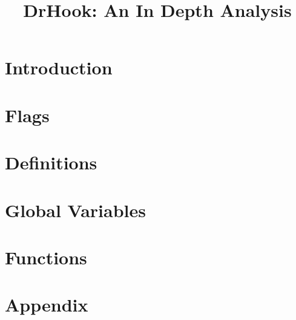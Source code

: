 \documentclass[techmemo]{ecmwfrep}%
\title{DrHook: An In Depth Analysis} %
\begin{document}



\newpage
\tableofcontents

\newpage
\chapter{Introduction}

\newpage
\chapter{Flags}

\newpage
\chapter{Definitions}

\newpage
\chapter{Global Variables}

\newpage
\chapter{Functions}

\newpage
\chapter{Appendix}

\end{document}
